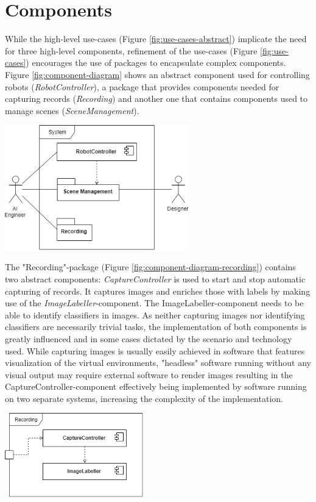 \section{Components}
While the high-level use-cases (Figure \ref{fig:use-cases-abstract}) implicate the need for three high-level components, refinement of the use-cases (Figure \ref{fig:use-cases}) encourages the use of packages to encapsulate complex components. Figure \ref{fig:component-diagram} shows an abstract component used for controlling robots (\emph{RobotController}), a package that provides components needed for capturing records (\emph{Recording}) and another one that contains components used to manage scenes (\emph{SceneManagement}).
\begin{center}
\noindent\includegraphics[width=8cm]{tex/img/ch04/ComponentDiagram_System01.png}
\label{fig:component-diagram}
\end{center}
The "Recording"-package (Figure \ref{fig:component-diagram-recording}) contains two abstract components: \emph{CaptureController} is used to start and stop automatic capturing of records. It captures images and enriches those with labels by making use of the \emph{ImageLabeller}-component. The ImageLabeller-component needs to be able to identify classifiers in images. As neither capturing images nor identifying classifiers are necessarily trivial tasks, the implementation of both components is greatly influenced and in some cases dictated by the scenario and technology used. While capturing images is usually easily achieved in software that features visualization of the virtual environments, "headless" software running without any visual output may require external software to render images resulting in the CaptureController-component effectively being implemented by software running on two separate systems, increasing the complexity of the implementation.
\begin{center}
\noindent\includegraphics[width=6cm]{tex/img/ch04/ComponentDiagram_Recording04.png}
\label{fig:component-diagram-recording}
\end{center}
